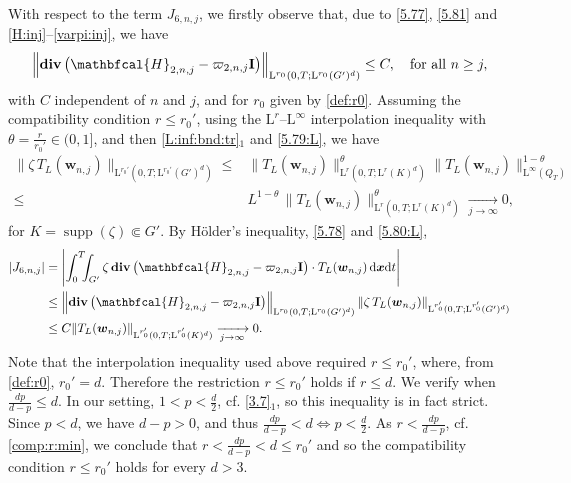 \documentclass[12pt,reqno]{amsart}
\numberwithin{equation}{section}
\let\originalleft\left
\let\originalright\right
\renewcommand{\left}{\mathopen{}\mathclose\bgroup\originalleft}
\renewcommand{\right}{\aftergroup\egroup\originalright}
\theoremstyle{definition}
\def\dxt{\,\mathrm{d}\boldsymbol{x}\mathrm{d}t}
\def\divv{\mathbf{div}\,}
\def\supp{\operatorname{supp}}
\def\L{\mathrm{L}}
\def\w{\boldsymbol{w}}
\def\bfI{\mathbf{I}}
\def\bcH{\mathbfcal{H}}
\begin{document}
{{{With respect to the term $J_{6,n,j}$, we firstly observe that, due to \eqref{5.77}, \eqref{5.81} and \eqref{H:inj}--\eqref{varpi:inj}, we have
\begin{equation}\label{5.78}
\left\|\divv\big(\bcH_{2,n,j}-\varpi_{2,n,j}\bfI\big)\right\|_{\L^{r_0}(0,T;\L^{r_0}(G')^d)}\leq C,
\quad \text{for all } n\ge j,
\end{equation}
with $C$ independent of $n$ and $j$, and for $r_0$ given by \eqref{def:r0}.
Assuming the compatibility condition $r\leq r_0'$, using the $\L^r$--$\L^\infty$ interpolation inequality with $\theta=\frac{r}{r_0'}\in(0,1]$, and then \eqref{L:inf:bnd:tr}$_1$ and \eqref{5.79:L}, we have
\begin{equation} \label{5.80:L}
\begin{split}
\|\zeta\,T_L(\w_{n,j})\|_{\L^{r_0'}(0,T;\L^{r_0'}(G')^d)} \leq & \|T_L(\w_{n,j})\|_{\L^{r}(0,T;\L^{r}(K)^d)}^{\theta}\|T_L(\w_{n,j})\|_{\L^{\infty}(Q_T)}^{1-\theta} \\
\leq & L^{1-\theta}\,\|T_L(\w_{n,j})\|_{\L^{r}(0,T;\L^{r}(K)^d)}^{\theta} \xrightarrow[j\to\infty]{}0,
\end{split}
\end{equation}
for $K=\supp(\zeta)\Subset G'$.
By H\"older's inequality, \eqref{5.78} and \eqref{5.80:L},
\begin{equation}\label{est:J6:n:j}
\begin{split}
\left|J_{6,n,j}\right| & =
\left|\int_0^T\!\!\!\int_{G'} \zeta\,\divv\big(\bcH_{2,n,j}-\varpi_{2,n,j}\bfI\big)\cdot T_L(\w_{n,j})\dxt\right| \\
&
\leq \left\|\divv\big(\bcH_{2,n,j}-\varpi_{2,n,j}\bfI\big)\right\|_{\L^{r_0}(0,T;\L^{r_0}(G')^d)}\,
\|\zeta\,T_L(\w_{n,j})\|_{\L^{r_0'}(0,T;\L^{r_0'}(G')^d)} \\
&
\leq C\|T_L(\w_{n,j})\|_{\L^{r_0'}(0,T;\L^{r_0'}(K)^d)}\xrightarrow[j\to\infty]{}0.
\end{split}
\end{equation}
Note that the interpolation inequality used above required $r\leq r_0'$, where, from \eqref{def:r0}, $r_0'= d$.
Therefore the restriction $r\leq r_0'$ holds if  $r\leq d$.
We verify when $\frac{dp}{d-p}\le d$.
In our setting, $1<p<\frac{d}{2}$, cf. \eqref{3.7}$_1$, so this inequality is in fact strict.
Since $p<d$, we have $d-p>0$, and thus
$\frac{dp}{d-p}< d \Leftrightarrow p< \frac{d}{2}$.
As $r<\frac{dp}{d-p}$, cf. \eqref{comp:r:min}, we conclude that
$r < \frac{dp}{d-p} < d \leq r_0'$
and so the compatibility condition $r\leq r_0'$ holds for every $d>3$.

}}}
\end{document}
